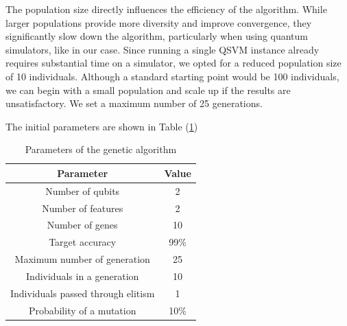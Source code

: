 \documentclass[12pt]{article}
\begin{document}
The population size directly influences the efficiency of the algorithm. While larger populations provide more diversity and improve convergence, they significantly slow down the algorithm, particularly when using quantum simulators, like in our case. Since running a single QSVM instance already requires substantial time on a simulator, we opted for a reduced population size of 10 individuals. Although a standard starting point would be 100 individuals, we can begin with a small population and scale up if the results are unsatisfactory. We set a maximum number of 25 generations.

The initial parameters are shown in Table (\ref{tabella accettanza})
\begin{table}[h]
    \centering
    \begin{tabular}{||c c||} 
     \hline
     Parameter & Value  \\ [0.5ex] 
     \hline\hline
     Number of qubits & 2 \\ 
     Number of features & 2  \\
     Number of genes & 10  \\
     Target accuracy & 99\%  \\ 
     Maximum number of generation & 25  \\
     Individuals in a generation & 10  \\ 
     Individuals passed through elitism & 1 \\
     Probability of a mutation & 10\% \\  
     \hline
    \end{tabular}
    \caption{Parameters of the genetic algorithm}
    \label{tabella accettanza}
\end{table}
\end{document}
